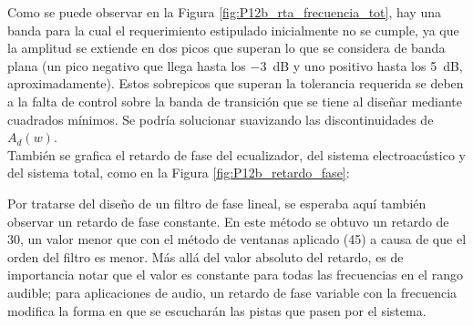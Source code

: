 	Como se puede observar en la Figura \ref{fig:P12b_rta_frecuencia_tot}, hay una banda para la cual el requerimiento estipulado inicialmente no se cumple, ya que la amplitud se extiende en dos picos que superan lo que se considera de banda plana (un pico negativo que llega hasta los \SI{-3}{\dB} y uno positivo hasta los \SI{5}{\dB}, aproximadamente). Estos sobrepicos que superan la tolerancia requerida se deben a la falta de control sobre la banda de transición que se tiene al diseñar mediante cuadrados mínimos. Se podría solucionar suavizando las discontinuidades de $A_d(w)$.\\


	También se grafica el retardo de fase del ecualizador, del sistema electroacústico y del sistema total, como en la Figura \ref{fig:P12b_retardo_fase}:

	
	
	Por tratarse del diseño de un filtro de fase lineal, se esperaba aquí también observar un retardo de fase constante. En este método se obtuvo un retardo de 30, un valor menor que con el método de ventanas aplicado (45) a causa de que el orden del filtro es menor. Más allá del valor absoluto del retardo, es de importancia notar que el valor es constante para todas las frecuencias en el rango audible; para aplicaciones de audio, un retardo de fase variable con la frecuencia modifica la forma en que se escucharán las pistas que pasen por el sistema.
	


